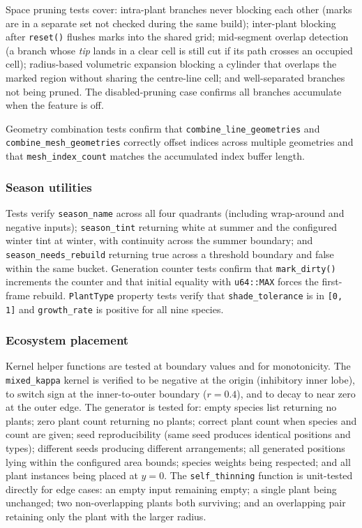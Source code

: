 \medskip
Space pruning tests cover: intra-plant branches never blocking each other (marks are in a separate set not
checked during the same build); inter-plant blocking after \texttt{reset()} flushes marks into the shared
grid; mid-segment overlap detection (a branch whose \emph{tip} lands in a clear cell is still cut if its path
crosses an occupied cell); radius-based volumetric expansion blocking a cylinder that overlaps the marked
region without sharing the centre-line cell; and well-separated branches not being pruned. The
disabled-pruning case confirms all branches accumulate when the feature is off.

\medskip
Geometry combination tests confirm that \texttt{combine\_line\_geometries} and
\texttt{combine\_mesh\_geometries} correctly offset indices across multiple geometries and that
\texttt{mesh\_index\_count} matches the accumulated index buffer length.

\subsubsection{Season utilities}
Tests verify \texttt{season\_name} across all four quadrants (including wrap-around and negative inputs);
\texttt{season\_tint} returning white at summer and the configured winter tint at winter, with continuity
across the summer boundary; and \texttt{season\_needs\_rebuild} returning true across a threshold boundary
and false within the same bucket. Generation counter tests confirm that \texttt{mark\_dirty()} increments the
counter and that initial equality with \texttt{u64::MAX} forces the first-frame rebuild. \texttt{PlantType}
property tests verify that \texttt{shade\_tolerance} is in \texttt{[0, 1]} and \texttt{growth\_rate} is
positive for all nine species.

\subsubsection{Ecosystem placement}
Kernel helper functions are tested at boundary values and for monotonicity. The \texttt{mixed\_kappa} kernel
is verified to be negative at the origin (inhibitory inner lobe), to switch sign at the inner-to-outer
boundary ($r = 0.4$), and to decay to near zero at the outer edge. The generator is tested for: empty species
list returning no plants; zero plant count returning no plants; correct plant count when species and count
are given; seed reproducibility (same seed produces identical positions and types); different seeds producing
different arrangements; all generated positions lying within the configured area bounds; species weights
being respected; and all plant instances being placed at $y = 0$. The \texttt{self\_thinning} function is
unit-tested directly for edge cases: an empty input remaining empty; a single plant being unchanged; two
non-overlapping plants both surviving; and an overlapping pair retaining only the plant with the larger radius.

